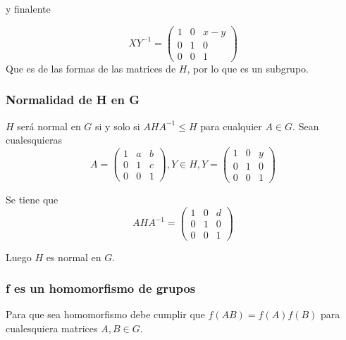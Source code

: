 \documentclass[12pt]{article}
\begin{document}
y finalente

\begin{equation*}
    XY^{-1} = 
    \begin{pmatrix}
        1 & 0 & x-y \\
        0 & 1 & 0 \\
        0 & 0 & 1
    \end{pmatrix}
\end{equation*}
Que es de las formas de las matrices de $H$, por lo que es un subgrupo.

\subsubsection*{Normalidad de H en G}

$H$ será normal en $G$ si y solo si $AHA^{-1} \leq H$ para cualquier $A \in G.$
Sean cualesquieras
\begin{equation*}
    A = 
    \begin{pmatrix}
        1 & a & b \\
        0 & 1 & c \\
        0 & 0 & 1
    \end{pmatrix}
    , Y \in H, 
    Y = 
    \begin{pmatrix}
        1 & 0 & y \\
        0 & 1 & 0 \\
        0 & 0 & 1
    \end{pmatrix}
\end{equation*}

Se tiene que 
\begin{equation*}
    A H A^{-1}= 
    \begin{pmatrix}
        1 & 0 & d \\
        0 & 1 & 0\\
        0 & 0 & 1
    \end{pmatrix}
\end{equation*}

Luego $H$ es normal en $G$.
\subsubsection*{f es un homomorfismo de grupos}

Para que sea homomorfismo debe cumplir que $f(AB) = f(A)f(B)$ 
    para cualesquiera matrices $A,B \in G.$
\end{document}
